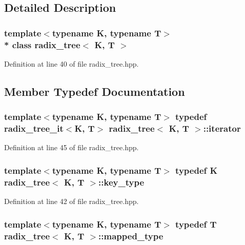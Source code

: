 \subsection{Detailed Description}
\subsubsection*{template$<$typename K, typename T$>$\\*
class radix\+\_\+tree$<$ K, T $>$}



Definition at line 40 of file radix\+\_\+tree.\+hpp.



\subsection{Member Typedef Documentation}
\subsubsection[{\texorpdfstring{iterator}{iterator}}]{\setlength{\rightskip}{0pt plus 5cm}template$<$typename K, typename T$>$ typedef {\bf radix\+\_\+tree\+\_\+it}$<$K, T$>$ {\bf radix\+\_\+tree}$<$ K, T $>$\+::{\bf iterator}}\hypertarget{classradix__tree_a820fe40af6049993760c529e918c5575}{}\label{classradix__tree_a820fe40af6049993760c529e918c5575}


Definition at line 45 of file radix\+\_\+tree.\+hpp.

\subsubsection[{\texorpdfstring{key\+\_\+type}{key_type}}]{\setlength{\rightskip}{0pt plus 5cm}template$<$typename K, typename T$>$ typedef K {\bf radix\+\_\+tree}$<$ K, T $>$\+::{\bf key\+\_\+type}}\hypertarget{classradix__tree_a9c91791a795ceee58a0c691a46956e8a}{}\label{classradix__tree_a9c91791a795ceee58a0c691a46956e8a}


Definition at line 42 of file radix\+\_\+tree.\+hpp.

\subsubsection[{\texorpdfstring{mapped\+\_\+type}{mapped_type}}]{\setlength{\rightskip}{0pt plus 5cm}template$<$typename K, typename T$>$ typedef T {\bf radix\+\_\+tree}$<$ K, T $>$\+::{\bf mapped\+\_\+type}}\hypertarget{classradix__tree_a08a4d9146274d8f166604a9ba670227d}{}\label{classradix__tree_a08a4d9146274d8f166604a9ba670227d}


